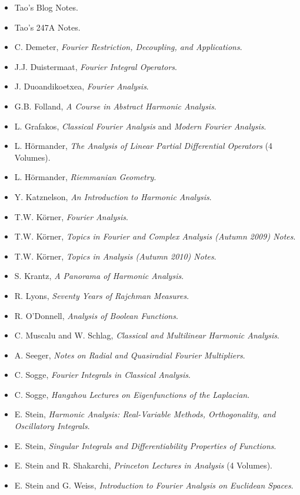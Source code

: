 \begin{itemize}
	\item Tao's Blog Notes.
	\item Tao's 247A Notes.
	\item C. Demeter, \emph{Fourier Restriction, Decoupling, and Applications}.
	\item J.J. Duistermaat, \emph{Fourier Integral Operators}.
	\item J. Duoandikoetxea, \emph{Fourier Analysis}.
	\item G.B. Folland, \emph{A Course in Abstract Harmonic Analysis}.
	\item L. Grafakos, \emph{Classical Fourier Analysis} and \emph{Modern Fourier Analysis}.
	\item L. H\"{o}rmander, \emph{The Analysis of Linear Partial Differential Operators} (4 Volumes).
	\item L. H\"{o}rmander, \emph{Riemmanian Geometry}.
	\item Y. Katznelson, \emph{An Introduction to Harmonic Analysis}.
	\item T.W. K\"{o}rner, \emph{Fourier Analysis}.
	\item T.W. K\"{o}rner, \emph{Topics in Fourier and Complex Analysis (Autumn 2009) Notes}.
	\item T.W. K\"{o}rner, \emph{Topics in Analysis (Autumn 2010) Notes}.
	\item S. Krantz, \emph{A Panorama of Harmonic Analysis}.
	\item R. Lyons, \emph{Seventy Years of Rajchman Measures}.
	\item R. O'Donnell, \emph{Analysis of Boolean Functions}.
	\item C. Muscalu and W. Schlag, \emph{Classical and Multilinear Harmonic Analysis}.
	\item A. Seeger, \emph{Notes on Radial and Quasiradial Fourier Multipliers}.
	\item C. Sogge, \emph{Fourier Integrals in Classical Analysis}.
	\item C. Sogge, \emph{Hangzhou Lectures on Eigenfunctions of the Laplacian}.
	\item E. Stein, \emph{Harmonic Analysis: Real-Variable Methods, Orthogonality, and Oscillatory Integrals}.
	\item E. Stein, \emph{Singular Integrals and Differentiability Properties of Functions}.
	\item E. Stein and R. Shakarchi, \emph{Princeton Lectures in Analysis} (4 Volumes).
	\item E. Stein and G. Weiss, \emph{Introduction to Fourier Analysis on Euclidean Spaces}.

\end{itemize}
